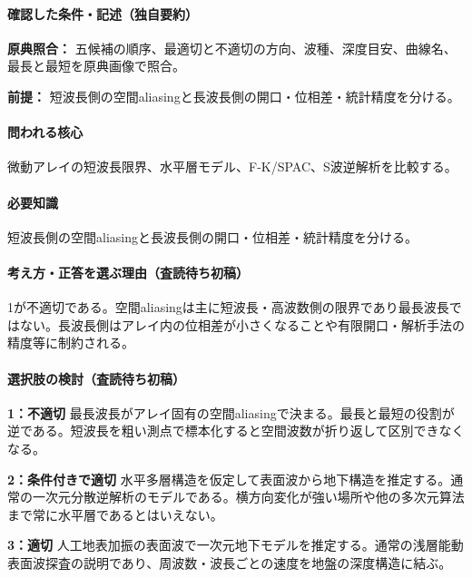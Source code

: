 \paragraph{確認した条件・記述（独自要約）}\mbox{}\par

\noindent\textbf{原典照合：} 五候補の順序、最適切と不適切の方向、波種、深度目安、曲線名、最長と最短を原典画像で照合。\par

\noindent\textbf{前提：} 短波長側の空間aliasingと長波長側の開口・位相差・統計精度を分ける。\par

\paragraph{問われる核心} 微動アレイの短波長限界、水平層モデル、F-K/SPAC、S波逆解析を比較する。

\paragraph{必要知識} 短波長側の空間aliasingと長波長側の開口・位相差・統計精度を分ける。

\paragraph{考え方・正答を選ぶ理由（査読待ち初稿）} 1が不適切である。空間aliasingは主に短波長・高波数側の限界であり最長波長ではない。長波長側はアレイ内の位相差が小さくなることや有限開口・解析手法の精度等に制約される。

\paragraph{選択肢の検討（査読待ち初稿）}\mbox{}\par

\noindent\textbf{1：不適切} 最長波長がアレイ固有の空間aliasingで決まる。最長と最短の役割が逆である。短波長を粗い測点で標本化すると空間波数が折り返して区別できなくなる。\par

\noindent\textbf{2：条件付きで適切} 水平多層構造を仮定して表面波から地下構造を推定する。通常の一次元分散逆解析のモデルである。横方向変化が強い場所や他の多次元算法まで常に水平層であるとはいえない。\par

\noindent\textbf{3：適切} 人工地表加振の表面波で一次元地下モデルを推定する。通常の浅層能動表面波探査の説明であり、周波数・波長ごとの速度を地盤の深度構造に結ぶ。\par

